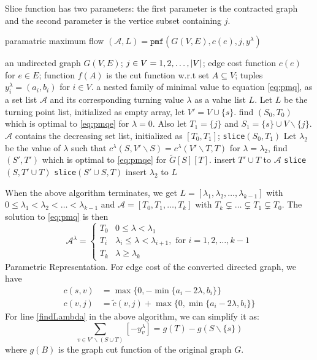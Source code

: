 \documentclass{article}
\begin{document}
Slice function has two parameters:
the first parameter is the contracted graph and the second parameter is the vertice subset containing $j$.
\begin{algorithm}
\caption{paramatric maximum flow $(\mathcal{A}, L) = \texttt{pmf}(G(V,E), c(e), j, y^{\lambda})$}
\begin{algorithmic}[1]
\REQUIRE an undirected graph $G(V, E)$; $j \in V={1,2,\dots, \lvert V\rvert}$; edge cost function $c(e)$ for $e \in E$; function $f(A)$ is the cut function w.r.t set $A\subseteq V$; tuples $y^{\lambda}_i = (a_i, b_i)$ for $i \in V$.
\ENSURE a nested family of minimal value to equation \eqref{eq:pmq}, as a set list $\mathcal{A}$ and its corresponding turning value $\lambda$ as a value list $L$.
\STATE Let $L$ be the turning point list, initialized as empty array, let $V'=V\cup\{s\}$.
\STATE find $(S_0, T_0)$ which is optimal to \eqref{eq:pmqe} for $ \lambda  = 0$.  Also let $T_1 = \{j\}$ and $S_1 = \{s\}\cup V \backslash \{j\}$.
\STATE $\mathcal{A}$ contains the decreasing set list, initialized as $[T_0, T_1]$;
\STATE \texttt{slice}$( S_0, T_1)$
  \STATE Let $\lambda_2$ be the value of $\lambda$ such that $c^{\lambda}(S, V'\backslash S) = 
c^{\lambda}(V'\backslash T, T)$ \label{findLambda}
\STATE for $\lambda = \lambda_2$, find $(S', T')$ which is optimal to \eqref{eq:pmqe} for $\widetilde{G}[S][T]$.
\STATE insert $T'\cup T$ to $\mathcal{A}$
\STATE \texttt{slice}$(S, T'\cup T)$
\STATE \texttt{slice}$(S'\cup S, T)$
\ELSE
\STATE insert $\lambda_2$ to $L$ 
\ENDIF
\ENDFUNCTION
\end{algorithmic}
\end{algorithm}
When the above algorithm terminates, we get $L=[\lambda_1, \lambda_2, \dots, \lambda_{k-1}]$ with
$0\leq \lambda_1 < \lambda_2 < \dots < \lambda_{k-1}$ and $\mathcal{A} = [T_0, T_1, \dots, T_k]$ with
$T_k \subsetneq  \dots \subsetneq T_1 \subsetneq T_0$.  The solution to \eqref{eq:pmq} is then
\begin{equation}
\mathcal{A}^{\lambda}=\begin{cases}
T_0 & 0 \leq \lambda < \lambda_1 \\
T_i & \lambda_i \leq \lambda < \lambda_{i+1}, \textrm{ for } i=1, 2, \dots, k-1 \\
T_k & \lambda \geq \lambda_{k}
\end{cases}
\end{equation}
Parametric Representation. For edge cost of the converted directed graph, we have
\begin{align}
c(s, v) &=  \max\{0, -\min\{a_i-2\lambda, b_i\}\} \\
c(v, j) & = \tilde{c}(v, j) + \max\{0, \min\{a_i - 2\lambda, b_i\}\}
\end{align}
For line \ref{findLambda} in the above algorithm,  we can simplify it as:
\begin{equation*}
\sum_{v\in V'\backslash (S\cup T)} [-y^{\lambda}_v ] = g(T)-g(S\backslash\{s\})
\end{equation*}
where $g(B)$ is the graph cut function of the original graph $G$.
\end{document}
